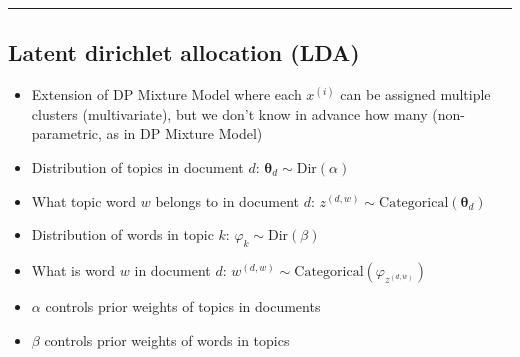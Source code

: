 {\color{black}\hrule height 0.001mm}

\subsection*{Latent dirichlet allocation (LDA)}
\begin{itemize}
    \item Extension of DP Mixture Model where each $x^{(i)}$ can be assigned multiple clusters (multivariate), but we don’t know in advance how many (non-parametric, as in DP Mixture Model)
    \item Distribution of topics in document $d$:
    $
    \boldsymbol{\theta}_d \sim \textrm{Dir}(\alpha)
    $
    \item What topic word $w$ belongs to in document $d$:
    $
    z^{(d,w)} \sim \textrm{Categorical}(\boldsymbol{\theta}_d)
    $
    \item Distribution of words in topic $k$:
    $
    \varphi_k \sim \textrm{Dir}(\beta)
    $
    \item What is word $w$ in document $d$:
    $
    w^{(d,w)} \sim \textrm{Categorical}(\varphi_{z^{(d,w)}})
    $
    \item $\alpha$ controls prior weights of topics in documents
    \item $\beta$ controls prior weights of words in topics
\end{itemize}